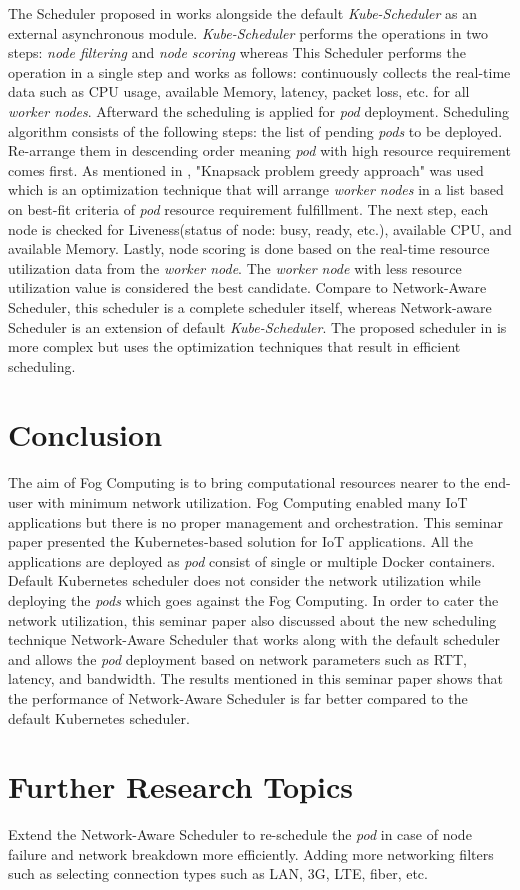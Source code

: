The Scheduler proposed in \cite{8903766} works alongside the default \emph{Kube-Scheduler} as an external asynchronous module. \emph{Kube-Scheduler} performs the operations in two steps: \emph{node filtering} and \emph{node scoring} whereas This Scheduler\cite{8903766} performs the operation in a single step and works as follows: continuously collects the real-time data such as CPU usage, available Memory, latency, packet loss, etc.  for all \emph{worker nodes}. Afterward the scheduling is applied for \emph{pod} deployment. Scheduling algorithm consists of the following steps\cite{8903766}: the list of pending \emph{pods} to be deployed. Re-arrange them in descending order meaning \emph{pod} with high resource requirement comes first. As mentioned in \cite{8903766}, "Knapsack problem greedy approach" was used which is an optimization technique that will arrange \emph{worker nodes} in a list based on best-fit criteria of \emph{pod} resource requirement fulfillment. The next step, each node is checked for Liveness(status of node: busy, ready, etc.), available CPU, and available Memory\cite{8903766}. Lastly, node scoring is done based on the real-time resource utilization data from the \emph{worker node}\cite{8903766}. The \emph{worker node} with less resource utilization value is considered the best candidate\cite{8903766}. Compare to Network-Aware Scheduler\cite{Santos2019}, this scheduler\cite{8903766} is a complete scheduler itself, whereas Network-aware Scheduler\cite{Santos2019} is an extension of default \emph{Kube-Scheduler}. The proposed scheduler in \cite{8903766} is more complex but uses the optimization techniques that result in efficient scheduling.
\section{Conclusion}
\label{sec:concl}
The aim of Fog Computing is to bring computational resources nearer to the end-user with minimum network utilization. Fog Computing enabled many IoT applications but there is no proper management and orchestration. This seminar paper presented the Kubernetes-based solution for IoT applications. All the applications are deployed as \emph{pod} consist of single or multiple Docker containers. Default Kubernetes scheduler does not consider the network utilization while deploying the \emph{pods} which goes against the Fog Computing. In order to cater the network utilization, this seminar paper also discussed about the new scheduling technique Network-Aware Scheduler that works along with the default scheduler and allows the \emph{pod} deployment based on network parameters such as RTT, latency, and bandwidth. The results mentioned in this seminar paper shows that the performance of Network-Aware Scheduler is far better compared to the default Kubernetes scheduler.
\section{Further Research Topics}
\label{sec:research}
Extend the Network-Aware Scheduler to re-schedule the \emph{pod} in case of node failure and network breakdown more efficiently. Adding more networking filters such as selecting connection types such as LAN, 3G, LTE, fiber, etc.
